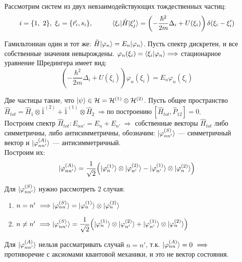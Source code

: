 \begin{example}
	Рассмотрим систем из двух невзаимодействующих тождественных частиц:
	\[
	i = \{1,~2\}, \ \xi_i = \{\vec{r}_i, s_i\}, \hspace*{1cm} \langle \xi_i | \hat{H} | \xi_j' \rangle = \left( -\dfrac{\hbar^2}{2m}\Delta_i + U(\xi_i) \right) \delta(\xi_i - \xi_i')
	\]
	
	Гамильтониан один и тот же: $\hat{H}| \varphi_n \rangle = E_n| \varphi_n \rangle$. Пусть спектр дискретен, и все собственные значения невырождены.
	$\varphi_n(\xi_i) = \langle \xi_i | \varphi_n \rangle \Longrightarrow$ стационарное уравнение Шредингера имеет вид:
	\[
	\left( -\dfrac{\hbar^2}{2m}\Delta_i + U(\xi_i) \right) \varphi_n(\xi_i) = E_n \varphi_n(\xi_i)
	\]
	
	Две частицы такие, что $| \psi \rangle \in \mathcal{H} = \mathcal{H}^{(1)} \otimes \mathcal{H}^{(2)}$. Пусть общее пространство $\hat{H}_{tot} = \hat{H}_1 \otimes \hat{1}^{(2)} + \hat{1}^{(1)} \otimes \hat{H}_2 \ \Longrightarrow \text{по построению} \ [\hat{H}_{tot}, \hat{P}_{12}] = 0$.\\
	
	Построим спектр $\hat{H}_{tot}: E_{nn'} = E_n + E_{n'} \ \Longrightarrow$ собственные векторы $\hat{H}_{tot}$ либо симметричны, либо антисимметричны, обозначим: $| \varphi_{nn'}^{(S)} \rangle$ --- симметричный вектор и $| \varphi_{nn'}^{(A)} \rangle$ --- антисимметричный.\\
	
	Построим их:
	\[
	| \varphi_{nn'}^{(A)} \rangle = \dfrac{1}{\sqrt{2}} \Big( | \varphi_n^{(1)} \rangle \otimes | \varphi_{n'}^{(2)} \rangle - | \varphi_{n'}^{(1)} \rangle \otimes | \varphi_n^{(2)} \rangle \Big)
	\]
	
	Для $| \varphi_{nn'}^{(S)} \rangle$ нужно рассмотреть 2 случая:
	\begin{enumerate}
		\item $n = n' \ \Longrightarrow | \varphi_{nn}^{(S)} \rangle = | \varphi_n^{(1)} \rangle \otimes | \varphi_n^{(2)} \rangle$
		\item $n \neq n' \ \Longrightarrow | \varphi_{nn'}^{(S)} \rangle = \dfrac{1}{\sqrt{2}} \Big( | \varphi_n^{(1)} \rangle \otimes | \varphi_{n'}^{(2)} \rangle + | \varphi_{n'}^{(1)} \rangle \otimes | \varphi_n^{(2)} \rangle \Big)$
	\end{enumerate}
	
	Для $| \varphi_{nn'}^{(A)} \rangle$ нельзя рассматривать случай $n = n'$, т.к. $\ket{\varphi_{nn}^{(A)}} = 0 \ \Longrightarrow$ противоречие с аксиомами квантовой механики, и это не вектор состояния.\\
	

\end{example}
